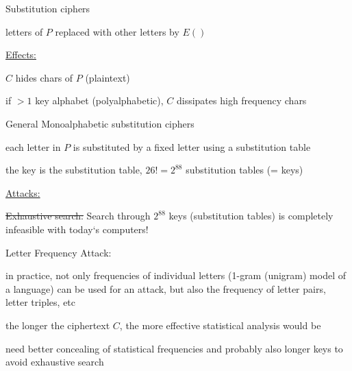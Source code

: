 \documentclass[landscape, a4paper]{article}
\begin{document}
\begin{minipage}[t]{0.198\pagewidth}
	\begin{betterlist}
		\item \alert{Substitution ciphers}
		\begin{betterlist}
			\item letters of $P$ replaced with other letters by $E()$
			\item \underline{Effects:}
			\begin{betterlist}
				\item $C$ hides chars of $P$ (plaintext)
				\item if $> 1$ key alphabet (polyalphabetic), $C$ dissipates high frequency chars
			\end{betterlist}
		\end{betterlist}
		\begin{betterlist}
			\item \alert{General Monoalphabetic substitution ciphers}
			\begin{betterlist}
				\item each letter in $P$ is substituted by a fixed letter using a \alert{substitution table}
				\item the \alert{key} is the substitution table, $26!=2^{88}$ substitution tables (= keys)
				\item \underline{Attacks:}
				\begin{betterlist}
					\item \sout{Exhaustive search:} Search through $2^{88}$ keys (substitution tables) is completely infeasible with today‘s computers!
					\item \alert{Letter Frequency Attack:}
					\begin{betterlist}
						\item in practice, not only frequencies of individual letters (\alert{1-gram} (unigram) model of a language) can be used for an attack, but also the frequency of letter pairs, letter triples, etc
						\item  the longer the ciphertext $C$, the more effective statistical analysis would be
					\end{betterlist}
				\end{betterlist}
				\item need better concealing of statistical frequencies and probably also longer keys to avoid exhaustive search

\end{betterlist}
\end{betterlist}
\end{betterlist}
\end{minipage}
\end{document}
